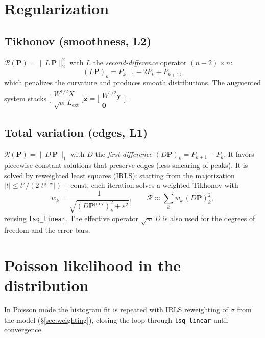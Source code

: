 \documentclass[11pt,a4paper]{article}
\newcommand{\code}[1]{\texttt{\small #1}}
\begin{document}
\section{Regularization}\label{sec:reg}

\subsection{Tikhonov (smoothness, L2)}
$\mathcal R(\bm P)=\lVert L\,\bm P\rVert_2^2$ with $L$ the \emph{second-difference}
operator $(n-2)\times n$:
\begin{equation}
  (L\bm P)_k = P_{k-1}-2P_k+P_{k+1},
\end{equation}
which penalizes the curvature and produces smooth distributions. The augmented
system stacks $\bigl[\begin{smallmatrix}W^{1/2}X\\ \sqrt\alpha\,L_{\text{ext}}\end{smallmatrix}\bigr]\bm z = \bigl[\begin{smallmatrix}W^{1/2}\bm y\\ \bm 0\end{smallmatrix}\bigr]$.

\subsection{Total variation (edges, L1)}
$\mathcal R(\bm P)=\lVert D\,\bm P\rVert_1$ with $D$ the \emph{first difference}
$(D\bm P)_k=P_{k+1}-P_k$. It favors piecewise-constant solutions that preserve
edges (less smearing of peaks). It is solved by reweighted least squares
(IRLS): starting from the majorization
$|t|\le t^2/(2|t^{\text{prev}}|)+\text{const}$, each iteration solves a weighted
Tikhonov with
\begin{equation}
  w_k = \frac{1}{\sqrt{(D\bm P^{\text{prev}})_k^2+\varepsilon^2}},
  \qquad \mathcal R\approx \sum_k w_k\,(D\bm P)_k^2,
\end{equation}
reusing \code{lsq\_linear}. The effective operator $\sqrt{w}\,D$ is also used
for the degrees of freedom and the error bars.

\section{Poisson likelihood in the distribution}
In Poisson mode the histogram fit is repeated with IRLS reweighting of
$\sigma$ from the model (\S\ref{sec:weighting}), closing the loop through
\code{lsq\_linear} until convergence.
\end{document}
